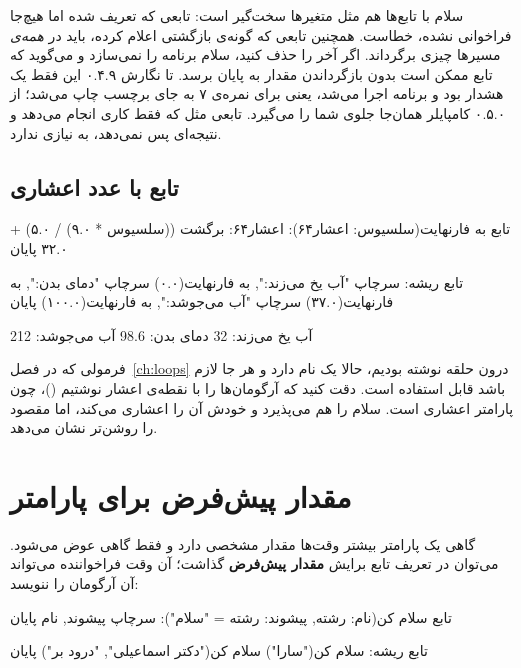 \begin{warn}
سلام با تابع‌ها هم مثل متغیرها سخت‌گیر است: تابعی که تعریف شده اما
هیچ‌جا فراخوانی نشده، خطاست. همچنین تابعی که گونه‌ی بازگشتی اعلام کرده،
باید در \emph{همه‌ی} مسیرها چیزی برگرداند. اگر  آخر را
حذف کنید، سلام برنامه را نمی‌سازد و می‌گوید که تابع ممکن است بدون
بازگرداندن مقدار به پایان برسد. تا نگارش ۰.۴.۹ این فقط یک هشدار بود و
برنامه اجرا می‌شد، یعنی برای نمره‌ی ۷ به جای برچسب  چاپ
می‌شد؛ از ۰.۵.۰ کامپایلر همان‌جا جلوی شما را می‌گیرد. تابعی مثل
 که فقط کاری انجام می‌دهد و نتیجه‌ای پس نمی‌دهد، به
 نیازی ندارد.
\end{warn}

\subsection{تابع با عدد اعشاری}

\begin{salamfa}
تابع به فارنهایت(سلسیوس: اعشار۶۴): اعشار۶۴:
    برگشت ((سلسیوس * ۹.۰) / ۵.۰) + ۳۲.۰
پایان

تابع ریشه:
    سرچاپ "آب یخ می‌زند:", به فارنهایت(۰.۰)
    سرچاپ "دمای بدن:", به فارنهایت(۳۷.۰)
    سرچاپ "آب می‌جوشد:", به فارنهایت(۱۰۰.۰)
پایان
\end{salamfa}

\begin{outputfa}
آب یخ می‌زند: 32
دمای بدن: 98.6
آب می‌جوشد: 212
\end{outputfa}

فرمولی که در فصل~\ref{ch:loops} درون حلقه نوشته بودیم، حالا یک نام دارد
و هر جا لازم باشد قابل استفاده است. دقت کنید که آرگومان‌ها را با نقطه‌ی
اعشار نوشتیم ()، چون پارامتر اعشاری است. سلام  را هم
می‌پذیرد و خودش آن را اعشاری می‌کند، اما  مقصود را روشن‌تر نشان
می‌دهد.

\section{مقدار پیش‌فرض برای پارامتر}

گاهی یک پارامتر بیشتر وقت‌ها مقدار مشخصی دارد و فقط گاهی عوض می‌شود.
می‌توان در تعریف تابع برایش \textbf{مقدار پیش‌فرض} گذاشت؛ آن وقت
فراخواننده می‌تواند آن آرگومان را ننویسد:

\begin{salamfa}
تابع سلام کن(نام: رشته, پیشوند: رشته = "سلام"):
    سرچاپ پیشوند, نام
پایان

تابع ریشه:
    سلام کن("سارا")
    سلام کن("دکتر اسماعیلی", "درود بر")
پایان
\end{salamfa}

